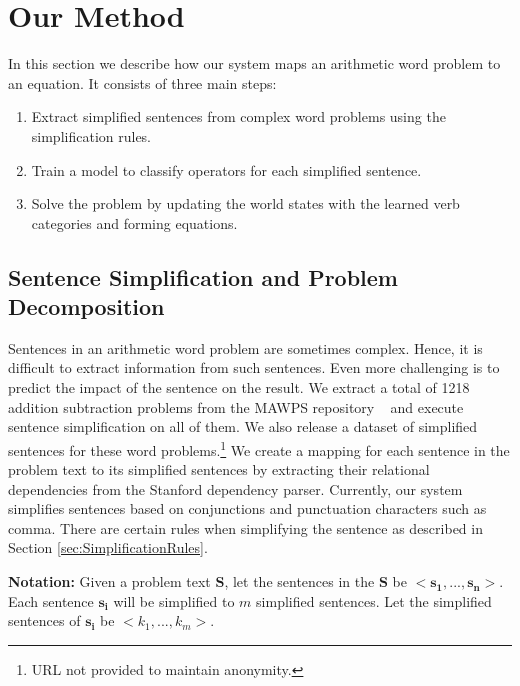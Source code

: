 \documentclass[11pt]{article}
\begin{document}
\section{Our Method}
In this section we describe how our system maps an arithmetic word problem to an equation. It consists of three main steps:
\begin{enumerate}[topsep=0pt,itemsep=-1ex,partopsep=1ex,parsep=1ex]
\item Extract simplified sentences from complex word problems using the simplification rules. 
\item Train a model to classify operators for each simplified sentence.
\item Solve the problem by updating the world states with the learned verb categories and forming equations.
\end{enumerate}

\subsection{Sentence Simplification and Problem Decomposition}
Sentences in an arithmetic word problem are sometimes complex. Hence, it is difficult to extract information from such sentences. Even more challenging is to predict the impact of the sentence on the result. We extract a total of 1218 addition subtraction problems from the MAWPS repository ~\cite{MAWPS} and execute sentence simplification on all of them. We also release a dataset of simplified sentences for these word problems.\footnote{URL not provided to maintain anonymity.} We create a mapping for each sentence in the problem text to its simplified sentences by extracting their relational dependencies from the Stanford dependency parser. Currently, our system simplifies sentences based on conjunctions and punctuation characters such as comma. There are certain rules when simplifying the sentence as described in Section \ref{sec:SimplificationRules}.

\textbf{Notation:} Given a problem text $\mathbf{S}$, let the sentences in the $\mathbf{S}$ be $\mathbf{<s_{1},..., s_{n}>}$. Each sentence $\mathbf{s_{i}}$ will be simplified to \begin{math}m\end{math} simplified sentences. Let the simplified sentences of $\mathbf{s_{i}}$ be $\mathit{<k_{1},..., k_{m}>}$.
\end{document}
